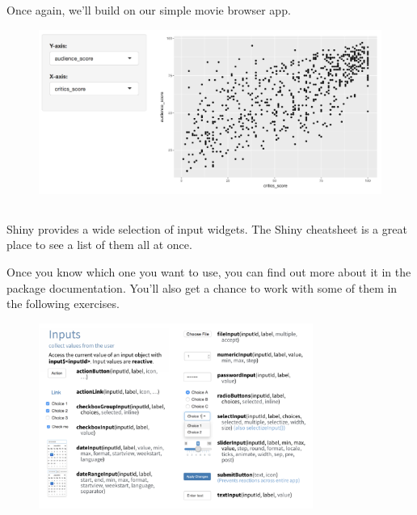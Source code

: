 \documentclass[
  letterpaper,
  DIV=11,
  numbers=noendperiod]{scrreprt}
\begin{document}
Once again, we'll build on our simple movie browser app.

\begin{figure}

{\centering \includegraphics[width=1\textwidth,height=\textheight]{./images/app-selectinput-scatterplot.png}

}

\end{figure}

\hypertarget{section-33}{%
\subsection{}\label{section-33}}

Shiny provides a wide selection of input widgets. The Shiny cheatsheet
is a great place to see a list of them all at once.

Once you know which one you want to use, you can find out more about it
in the package documentation. You'll also get a chance to work with some
of them in the following exercises.

\begin{figure}

{\centering \includegraphics[width=0.8\textwidth,height=\textheight]{./images/cheatsheet-inputs.png}

}

\end{figure}
\end{document}
